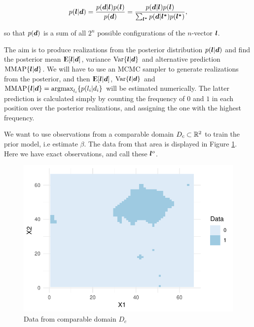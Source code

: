 \begin{equation*}
    p(\bm{l}|\bm{d}) = \frac{p(\bm{d}|\bm{l})p(\bm{l})}{p(\bm{d})} = \frac{p(\bm{d}|\bm{l})p(\bm{l})}{\sum_{\bm{l^*}}p(\bm{d}|\bm{l^*})p(\bm{l^*})} ,
\end{equation*}

so that  $p(\bm{d})$ is a sum of all $2^n$ possible configurations of the $n$-vector $\bm{l}$.

The aim is to produce realizations from the posterior distribution $p(\bm{l}|\bm{d})$ and find the posterior mean ${\rm I\kern-.3em E}[\bm{l} | \bm{d}]$, variance $\mathrm{Var}\{\bm{l} | \bm{d}\}$ and alternative prediction $\textrm{MMAP}\{\bm{l} | \bm{d}\}$. We will have to use an MCMC sampler to generate realizations from the posterior, and then ${\rm I\kern-.3em E}[\bm{l} | \bm{d}]$, $\mathrm{Var}\{\bm{l} | \bm{d}\}$ and $\textrm{MMAP}\{\bm{l} | \bm{d}\} = \textrm{argmax}_{l_i}\{ p(l_i|d_i\}$ will be estimated numerically. The latter prediction is calculated simply by counting the frequency of $0$ and $1$ in each position over the posterior realizations, and assigning the one with the highest frequency.

We want to use observations from a comparable domain $D_c \subset \mathbb{R}^2$ to train the prior model, i.e estimate $\beta$. The data from that area is displayed in Figure \ref{fig:complit_data}. Here we have exact observations, and call these $\bm{l}^o$.

\begin{figure}
    \centering
    \includegraphics[scale=0.95]{figures/complit_data.pdf}
    \caption{Data from comparable domain $D_c$}
    \label{fig:complit_data}
\end{figure}


